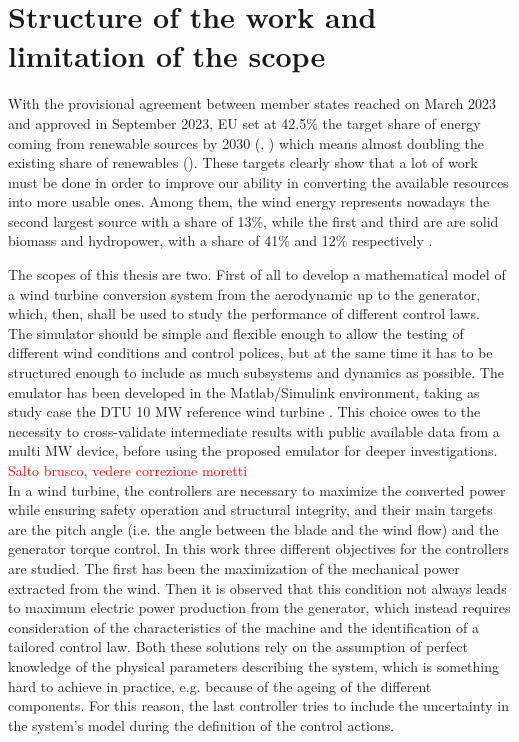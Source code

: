 \newpage
\section{Structure of the work and limitation of the scope}\label{sec:b_introduction}
With the provisional agreement between member states reached on March 2023 and approved in September 2023, EU set at 42.5\% the target share of energy coming from renewable sources by 2030 (\cite{rauters}, \cite{EU_targets}) which means almost doubling the existing share of renewables (\cite{EU_targets}). These targets clearly show that a lot of work must be done in order to improve our ability in converting the available resources into more usable ones. Among them, the wind energy represents nowadays the second largest source with a share of 13\%, while the first and third are are solid biomass and hydropower, with a share of 41\% and 12\% respectively \cite{ren_share}. 

The scopes of this thesis are two. First of all to develop a mathematical model of a wind turbine conversion system from the aerodynamic up to the generator, which, then, shall be used to study the performance of different control laws.\\
The simulator should be simple and flexible enough to allow the testing of different wind conditions and control polices, but at the same time it has to be structured enough to include as much subsystems and dynamics as possible. The emulator has been developed in the Matlab/Simulink environment, taking as study case the DTU 10 MW reference wind turbine \cite{DTU_Wind_Energy_Report-I-0092}. This choice owes to the necessity to cross-validate intermediate results with public available data from a multi MW device, before using the proposed emulator for deeper investigations. \textcolor{red}{Salto brusco, vedere correzione moretti}\\
In a wind turbine, the controllers are necessary to maximize the converted power while ensuring safety operation and structural integrity, and their main targets are the pitch angle (i.e. the angle between the blade and the wind flow) and the generator torque control. In this work three different objectives for the controllers are studied. The first has been the maximization of the mechanical power extracted from the wind. Then it is observed that this condition not always leads to maximum electric power production from the generator, which instead requires consideration of the characteristics of the machine and the identification of a tailored control law. Both these solutions rely on the assumption of perfect knowledge of the physical parameters describing the system, which is something hard to achieve in practice, e.g. because of the ageing of the different components. For this reason, the last controller tries to include the uncertainty in the system's model during the definition of the control actions.  

